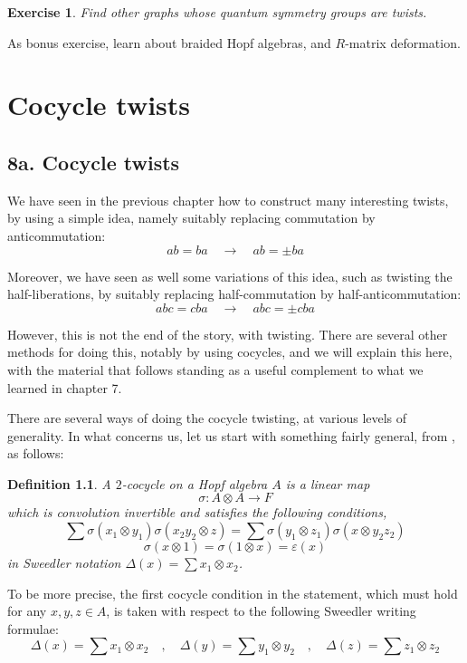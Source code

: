 \documentclass[12pt]{amsbook}
\newtheorem{definition}[theorem]{Definition}
\newtheorem{exercise}[theorem]{Exercise}
\begin{document}
\begin{exercise}
Find other graphs whose quantum symmetry groups are twists.
\end{exercise}

As bonus exercise, learn about braided Hopf algebras, and $R$-matrix deformation.

\chapter{Cocycle twists}

\section*{8a. Cocycle twists}

We have seen in the previous chapter how to construct many interesting twists, by using a simple idea, namely suitably replacing commutation by anticommutation:
$$ab=ba\quad\to\quad ab=\pm ba$$

Moreover, we have seen as well some variations of this idea, such as twisting the half-liberations, by suitably replacing half-commutation by half-anticommutation:
$$abc=cba\quad\to\quad abc=\pm cba$$

However, this is not the end of the story, with twisting. There are several other methods for doing this, notably by using cocycles, and we will explain this here, with the material that follows standing as a useful complement to what we learned in chapter 7.

\bigskip 

There are several ways of doing the cocycle twisting, at various levels of generality. In what concerns us, let us start with something fairly general, from \cite{doi}, as follows:


\begin{definition}
A $2$-cocycle on a Hopf algebra $A$ is a linear map 
$$\sigma:A\otimes A\to F$$
which is convolution invertible and satisfies the following conditions,
$$\sum\sigma(x_1\otimes y_1)\sigma(x_2y_2\otimes z)=\sum\sigma(y_1\otimes z_1)\sigma(x\otimes y_2z_2)$$
$$\sigma(x\otimes 1)=\sigma(1\otimes x)=\varepsilon(x)$$
in Sweedler notation $\Delta(x)=\sum x_1\otimes x_2$.
\end{definition}

To be more precise, the first cocycle condition in the statement, which must hold for any $x,y,z\in A$, is taken with respect to the following Sweedler writing formulae:
$$\Delta(x)=\sum x_1\otimes x_2\quad,\quad 
\Delta(y)=\sum y_1\otimes y_2\quad,\quad 
\Delta(z)=\sum z_1\otimes z_2$$
\end{document}
